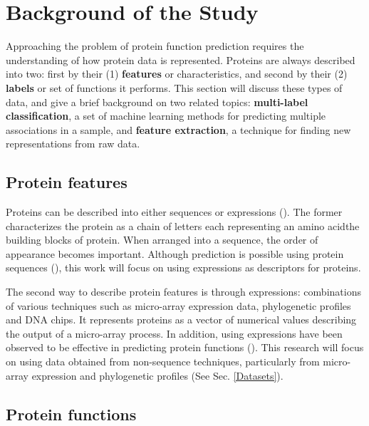 \section{Background of the Study}
\label{Background}

Approaching the problem of protein function prediction requires the
understanding of how protein data is represented. Proteins are always
described into two: first by their (1) \textbf{features} or characteristics,
and second by their (2) \textbf{labels} or set of functions it performs. This
section will discuss these types of data, and give a brief background on two
related topics: \textbf{multi-label classification}, a set of machine learning
methods for predicting multiple associations in a sample, and \textbf{feature 
extraction}, a technique for finding new representations from raw data.

\subsection{Protein features}

\par Proteins can be described into either sequences or expressions 
(\cite{xiong2006essential}). The former characterizes the protein as a chain
of letters each representing an amino acid\textemdash the building blocks of
protein. When arranged into a sequence, the order of appearance becomes important.
Although prediction is possible using protein sequences (\cite{whisstock2003prediction,
devos2000practical}), this work will focus on using expressions as descriptors
for proteins. 

\par The second way to describe protein features is through expressions:
combinations of various techniques such as micro-array expression data,
phylogenetic profiles and DNA chips. It represents proteins as a vector of
numerical values describing the output of a micro-array process. In addition,
using expressions have been observed to be effective in predicting protein
functions (\cite{eisenberg2000protein, marcotte1999combined}). This research
will focus on using data obtained from non-sequence techniques, particularly
from micro-array expression and phylogenetic profiles (See Sec.
\ref{Datasets}).

\subsection{Protein functions}

